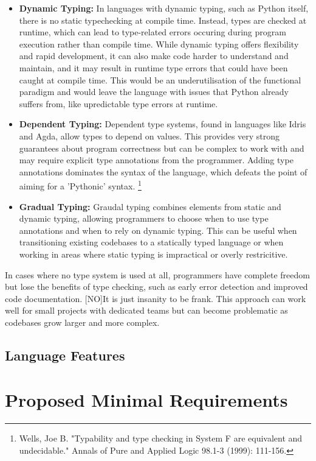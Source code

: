 \documentclass{l4proj}
\begin{document}
\begin{itemize}
    \item \textbf{Dynamic Typing:} In languages with dynamic typing, such as Python itself, there is no static typechecking at compile time.
    Instead, types are checked at runtime, which can lead to type-related errors occuring during program execution rather than compile time. 
    While dynamic typing offers flexibility and rapid development, it can also make code harder to understand and maintain, and it may result in runtime type errors that could have been caught at compile time.
    This would be an underutilisation of the functional paradigm and would leave the language with issues that Python already suffers from, like upredictable type errors at runtime.
    \item \textbf{Dependent Typing:} Dependent type systems, found in languages like Idris and Agda, allow types to depend on values.
    This provides very strong guarantees about program correctness but can be complex to work with and may require explicit type annotations from the programmer.
    Adding type annotations dominates the syntax of the language, which defeats the point of aiming for a 'Pythonic' syntax. \footnote{Wells, Joe B. "Typability and type checking in System F are equivalent and undecidable." Annals of Pure and Applied Logic 98.1-3 (1999): 111-156.}
    \item \textbf{Gradual Typing:} Graudal typing combines elements from static and dynamic typing, allowing programmers to choose when to use type annotations and when to rely on dynamic typing.
    This can be useful when transitioning existing codebases to a statically typed language or when working in areas where static typing is impractical or overly restricitive.
\end{itemize}

In cases where no type system is used at all, programmers have complete freedom but lose the benefits of type checking, such as early error detection and improved code documentation.
[NO]It is just insanity to be frank.
This approach can work well for small projects with dedicated teams but can become problematic as codebases grow larger and more complex.

\subsection{Language Features}

\section{Proposed Minimal Requirements}
\end{document}
